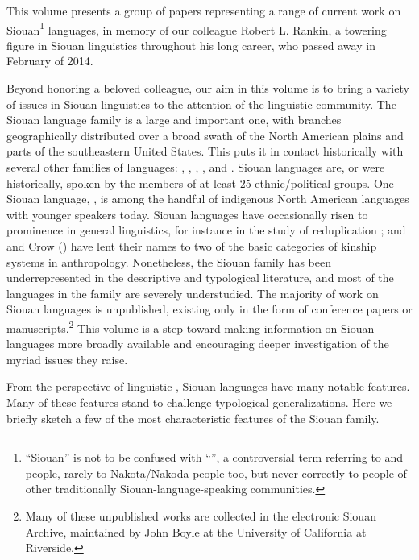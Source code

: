 \begin{refsection}

This volume presents a group of papers representing a range of current work on Siouan\footnote{``Siouan'' is not to be confused with ``'', a controversial term referring to  and  people, rarely to Nakota/Nakoda people too, but never correctly to people of other traditionally Siouan-language-speaking communities.} languages, in memory of our colleague Robert L. Rankin, a towering figure in Siouan linguistics throughout his long career, who passed away in February of 2014.


Beyond honoring a beloved colleague, our aim in this volume is to bring a variety of issues in Siouan linguistics to the attention of the linguistic community. The Siouan language family is a large and important one, with branches geographically distributed over a broad swath of the North American plains and parts of the southeastern United States. This puts it in contact historically with several other families of languages: , , , , and . Siouan languages are, or were historically, spoken by the members of at least 25 ethnic/political groups. One Siouan language, , is among the handful of indigenous North American languages with younger speakers today. Siouan languages have occasionally risen to prominence in general linguistics, for instance in the study of reduplication \citep{Shaw1980}; and  and Crow () have lent their names to two of the basic categories of kinship systems in anthropology. Nonetheless, the Siouan family has been underrepresented in the descriptive and typological literature, and most of the languages in the family are severely understudied. The majority of work on Siouan languages is unpublished, existing only in the form of conference papers or manuscripts.\footnote{Many of these unpublished works are collected in the electronic Siouan Archive, maintained by John Boyle at the University of California at Riverside.} This volume is a step toward making information on Siouan languages more broadly available and encouraging deeper investigation of the myriad issues they raise.


From the perspective of linguistic , Siouan languages have many notable features. Many of these features stand to challenge typological generalizations. Here we briefly sketch a few of the most characteristic features of the Siouan family.



\end{refsection}
